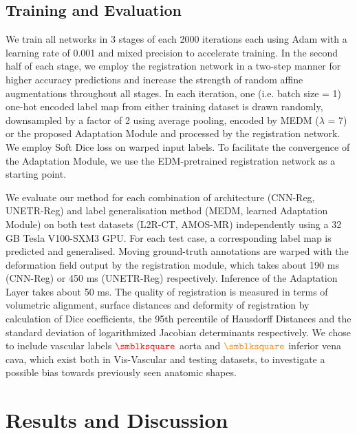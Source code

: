 \subsection{Training and Evaluation}
We train all networks in 3 stages of each 2000 iterations each using Adam with a learning rate of 0.001 and mixed precision to accelerate training. In the second half of each stage, we employ the registration network in a two-step manner for higher accuracy predictions and increase the strength of random affine augmentations throughout all stages. In each iteration, one (i.e. batch size = 1) one-hot encoded label map from either training dataset is drawn randomly, downsampled by a factor of 2 using average pooling, encoded by MEDM ($\lambda$ = 7) or the proposed Adaptation Module and processed by the registration network. We employ Soft Dice loss on warped input labels. To facilitate the convergence of the Adaptation Module, we use the EDM-pretrained registration network as a starting point. 

We evaluate our method for each combination of architecture (CNN-Reg, UNETR-Reg) and label generalisation method (MEDM, learned Adaptation Module) on both test datasets (L2R-CT, AMOS-MR) independently using a 32 GB Tesla V100-SXM3 GPU. For each test case, a corresponding label map is predicted and generalised. Moving ground-truth annotations are warped with the deformation field output by the registration module, which takes about 190 ms (CNN-Reg) or 450 ms (UNETR-Reg) respectively. Inference of the Adaptation Layer takes about 50 ms. The quality of registration is measured in terms of volumetric alignment, surface distances and deformity of registration by calculation of Dice coefficients, the 95th percentile of Hausdorff Distances and the standard deviation of logarithmized Jacobian determinants respectively. We chose to include vascular labels $\color{red}{\smblksquare}$ aorta and $\color{orange}{\smblksquare}$ inferior vena cava, which exist both in Vis-Vascular and testing datasets, to investigate a possible bias towards previously seen anatomic shapes. 

\section{Results and Discussion}


